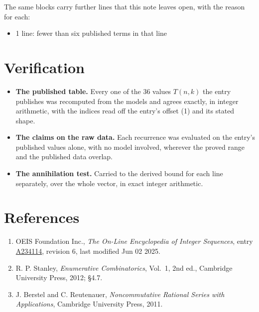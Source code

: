 \documentclass[11pt]{article}
\theoremstyle{definition}
\begin{document}
The same blocks carry further lines that this note leaves open, with the reason for each:

\begin{itemize}

\item 1 line: fewer than six published terms in that line

\end{itemize}

\section{Verification}

\begin{itemize}

\item {\bfseries The published table.} Every one of the 36 values $T(n,k)$ the entry publishes was recomputed from the models and agrees exactly, in integer arithmetic, with the indices read off the entry's offset (1) and its stated shape.

\item {\bfseries The claims on the raw data.} Each recurrence was evaluated on the entry's published values alone, with no model involved, wherever the proved range and the published data overlap.

\item {\bfseries The annihilation test.} Carried to the derived bound for each line separately, over the whole vector, in exact integer arithmetic.

\end{itemize}

\section{References}

\begin{enumerate}

\item OEIS Foundation Inc., \emph{The On-Line Encyclopedia of Integer Sequences}, entry \href{https://oeis.org/A234114}{A234114}, revision 6, last modified Jun 02 2025.

\item R. P. Stanley, \emph{Enumerative Combinatorics}, Vol.~1, 2nd ed., Cambridge University Press, 2012; \S4.7.

\item J. Berstel and C. Reutenauer, \emph{Noncommutative Rational Series with Applications}, Cambridge University Press, 2011.

\end{enumerate}
\end{document}
